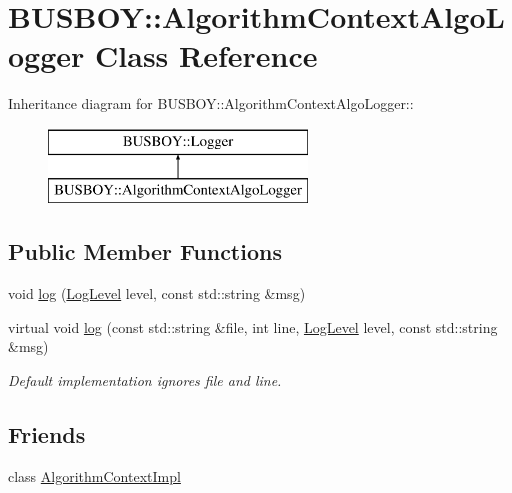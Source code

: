 \hypertarget{classBUSBOY_1_1AlgorithmContextAlgoLogger}{
\section{BUSBOY::AlgorithmContextAlgoLogger Class Reference}
\label{classBUSBOY_1_1AlgorithmContextAlgoLogger}
}
Inheritance diagram for BUSBOY::AlgorithmContextAlgoLogger::\begin{figure}[H]
\begin{center}
\leavevmode
\includegraphics[height=2cm]{classBUSBOY_1_1AlgorithmContextAlgoLogger}
\end{center}
\end{figure}
\subsection*{Public Member Functions}
\begin{DoxyCompactItemize}
\item 
void \hyperlink{classBUSBOY_1_1AlgorithmContextAlgoLogger_aec09b54bdae94b073e215ca5bab0a081}{log} (\hyperlink{classBUSBOY_1_1Logger_ac674cbb789eaa29c338c66248a4e4234}{LogLevel} level, const std::string \&msg)
\item 
virtual void \hyperlink{classBUSBOY_1_1AlgorithmContextAlgoLogger_a9ab10c3c0978fda39e71bf89abb63c32}{log} (const std::string \&file, int line, \hyperlink{classBUSBOY_1_1Logger_ac674cbb789eaa29c338c66248a4e4234}{LogLevel} level, const std::string \&msg)
\begin{DoxyCompactList}\small\item\em Default implementation ignores file and line. \item\end{DoxyCompactList}\end{DoxyCompactItemize}
\subsection*{Friends}
\begin{DoxyCompactItemize}
\item 
class \hyperlink{classBUSBOY_1_1AlgorithmContextAlgoLogger_a8f92c5456e2dd462f5c59bd25b0bf9da}{AlgorithmContextImpl}
\end{DoxyCompactItemize}


